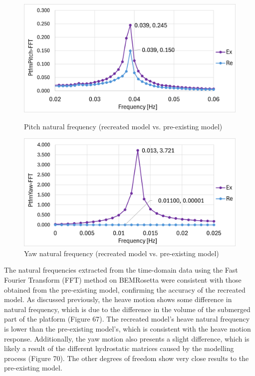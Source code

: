 \documentclass[a4paper, 11pt]{article}
\begin{document}
\begin{figure}[H]
    \begin{minipage}{0.47\textwidth}
        \centering
        \includegraphics[width=1\textwidth]{nat_freq_pitch_1.png}
        \caption{\small Pitch natural frequency (recreated model vs. pre-existing model)}
        \label{fig:nat_freq_pitch_recreated}
    \end{minipage}
    \hfill
    \begin{minipage}{0.48\textwidth}
        \centering
        \includegraphics[width=1\textwidth]{nat_freq_yaw_1.png}
        \caption{\small Yaw natural frequency (recreated model vs. pre-existing model)}
        \label{fig:nat_freq_yaw_recreated}
    \end{minipage}
\end{figure}


The natural frequencies extracted from the time-domain data using the Fast Fourier Transform (FFT) method on BEMRosetta were consistent with those obtained from the pre-existing model, confirming the accuracy of the recreated model. As discussed previously, the heave motion shows some difference in natural frequency, which is due to the difference in the volume of the submerged part of the platform (Figure 67). The recreated model's heave natural frequency is lower than the pre-existing model's, which is consistent with the heave motion response. Additionally, the yaw motion also presents a slight difference, which is likely a result of the different hydrostatic matrices caused by the modelling process (Figure 70). The other degrees of freedom show very close results to the pre-existing model.
\end{document}
